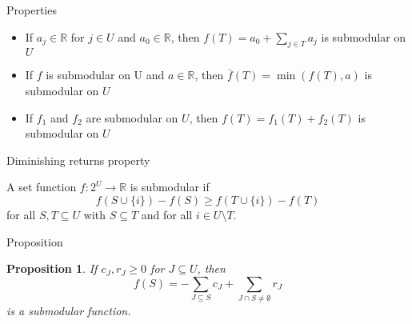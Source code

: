 \documentclass[usenames,dvipsnames]{beamer}
\newcommand{\R}{\mathbb{R}}
\newtheorem{prop}{Proposition}
\begin{document}

\begin{frame}{Properties}
  \begin{itemize}
  \item If $a_j \in \R$ for $j \in U$ and $a_0 \in \R$, then $f(T) =
    a_0 + \sum\limits_{j \in T} a_j$ is submodular on $U$
  \item If $f$ is submodular on U and $a \in \R$, then $\bar{f}(T) =
    \min(f(T),a)$ is submodular on $U$
  \item If $f_1$ and $f_2$ are submodular on $U$, then $f(T) = f_1(T)
    + f_2(T)$ is submodular on $U$
  \end{itemize}
\end{frame}

\begin{frame}{Diminishing returns property}
  \begin{definition}
    A set function $f : 2^U \rightarrow \R$ is submodular if \[f(S
    \cup \{i\}) - f(S) \geq f(T \cup \{i\}) - f(T) \] for all $S,T
    \subseteq U$ with $S \subseteq T$ and for all $i \in U \setminus
    T$.
  \end{definition}
\end{frame}

\begin{frame}{Proposition}
  \begin{prop}\label{prop}
    If $c_J, r_J \geq 0$ for $J \subseteq U$,
    then \begin{equation}f(S) = -\sum\limits_{J \subseteq S} c_J +
      \sum\limits_{J \cap S \neq \emptyset}
      r_J\label{prop}\end{equation} is a submodular function.
  \end{prop}
\end{frame}
\end{document}
